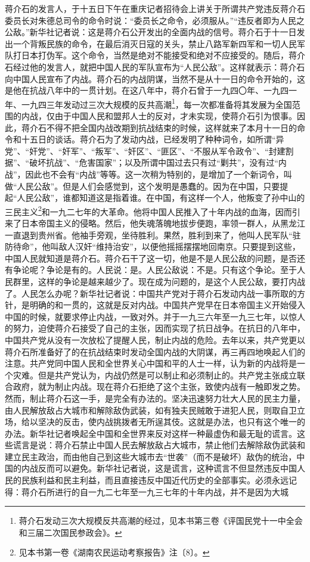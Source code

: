 \documentclass[cn,11pt,chinese]{elegantbook}
\begin{document}
蒋介石的发言人，于十五日下午在重庆记者招待会上讲关于所谓共产党违反蒋介石委员长对朱德总司令的命令时说：“委员长之命令，必须服从。”“违反者即为人民之公敌。”新华社记者说：这是蒋介石公开发出的全面内战的信号。蒋介石于十一日发出一个背叛民族的命令，在最后消灭日寇的关头，禁止八路军新四军和一切人民军队打日本打伪军。这个命令，当然是绝对不能接受和绝对不应接受的。随后，蒋介石经过他的发言人，就把中国人民的军队宣布为“人民公敌”。这样就表示：蒋介石向中国人民宣布了内战。蒋介石的内战阴谋，当然不是从十一日的命令开始的，这是他在抗战八年中的一贯计划。在这八年中，蒋介石曾于一九四〇年、一九四一年、一九四三年发动过三次大规模的反共高潮\footnote[1]{ 蒋介石发动三次大规模反共高潮的经过，见本书第三卷《评国民党十一中全会和三届二次国民参政会》。}，每一次都准备将其发展为全国范围的内战，仅由于中国人民和盟邦人士的反对，才未实现，使蒋介石引为恨事。因此，蒋介石不得不把全国内战改期到抗战结束的时候，这样就来了本月十一日的命令和十五日的谈话。蒋介石为了发动内战，已经发明了种种词令，如所谓“异党”、“奸党”、“奸军”、“叛军”、“奸区”、“匪区”、“不服从军令政令”、“封建割据”、“破坏抗战”、“危害国家”；以及所谓中国过去只有过“剿共”，没有过“内战”，因此也不会有“内战”等等。这一次稍为特别的，是增加了一个新词令，叫做“人民公敌”。但是人们会感觉到，这个发明是愚蠢的。因为在中国，只要提起“人民公敌”，谁都知道这是指着谁。在中国，有这样一个人，他叛变了孙中山的三民主义\footnote[2]{ 见本书第一卷《湖南农民运动考察报告》注〔8〕。}和一九二七年的大革命。他将中国人民推入了十年内战的血海，因而引来了日本帝国主义的侵略。然后，他失魂落魄地拔步便跑，率领一群人，从黑龙江一直退到贵州省。他袖手旁观，坐待胜利。果然，胜利到来了，他叫人民军队“驻防待命”，他叫敌人汉奸“维持治安”，以便他摇摇摆摆地回南京。只要提到这些，中国人民就知道是蒋介石。蒋介石干了这一切，他是不是人民公敌的问题，是否还有争论呢？争论是有的。人民说：是。人民公敌说：不是。只有这个争论。至于人民群里，这样的争论是越来越少了。现在成为问题的，是这个人民公敌，要打内战了。人民怎么办呢？新华社记者说：中国共产党对于蒋介石发动内战一事所取的方针，是明确的和一贯的，这就是反对内战。中国共产党早在日本帝国主义开始侵入中国的时候，就要求停止内战，一致对外。并于一九三六年至一九三七年，以惊人的努力，迫使蒋介石接受了自己的主张，因而实现了抗日战争。在抗日的八年中，中国共产党从没有一次放松了提醒人民，制止内战的危险。去年以来，共产党更以蒋介石所准备好了的在抗战结束时发动全国内战的大阴谋，再三再四地唤起人们的注意。共产党同中国人民和全世界关心中国和平的人士一样，认为新的内战将是一个灾难。但是共产党认为，内战仍然是可以制止和必须制止的。共产党主张成立联合政府，就为制止内战。现在蒋介石拒绝了这个主张，致使内战有一触即发之势。然而，制止蒋介石这一手，是完全有办法的。坚决迅速努力壮大人民的民主力量，由人民解放敌占大城市和解除敌伪武装，如有独夫民贼敢于进犯人民，则取自卫立场，给以坚决的反击，使内战挑拨者无所逞其伎。这就是办法，也只有这个唯一的办法。新华社记者唤起全中国和全世界来反对这样一种最虚伪和最无耻的谎言。这些谎言是说：蒋介石禁止中国人民去解放敌占大城市，禁止他们去解除敌伪武装和建立民主政治，而由他自己到这些大城市去“世袭”（而不是破坏）敌伪的统治，中国的内战反而可以避免。新华社记者说，这是谎言，这种谎言不但显然违反中国人民的民族利益和民主利益，而且直接违反中国近代历史的全部事实。必须永远记得：蒋介石所进行的自一九二七年至一九三七年的十年内战，并不是因为大城
\end{document}
